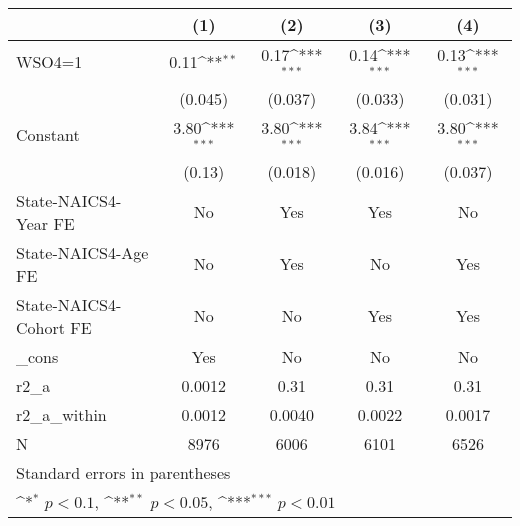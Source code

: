 {
\def\sym#1{\ifmmode^{#1}\else\(^{#1}\)\fi}
\begin{tabular}{l*{4}{c}}
\hline\hline
                    &\multicolumn{1}{c}{(1)}         &\multicolumn{1}{c}{(2)}         &\multicolumn{1}{c}{(3)}         &\multicolumn{1}{c}{(4)}         \\
\hline
WSO4=1              &        0.11\sym{**} &        0.17\sym{***}&        0.14\sym{***}&        0.13\sym{***}\\
                    &     (0.045)         &     (0.037)         &     (0.033)         &     (0.031)         \\
[1em]
Constant            &        3.80\sym{***}&        3.80\sym{***}&        3.84\sym{***}&        3.80\sym{***}\\
                    &      (0.13)         &     (0.018)         &     (0.016)         &     (0.037)         \\
[1em]
State-NAICS4-Year FE&          No         &         Yes         &         Yes         &          No         \\
[1em]
State-NAICS4-Age FE &          No         &         Yes         &          No         &         Yes         \\
[1em]
State-NAICS4-Cohort FE&          No         &          No         &         Yes         &         Yes         \\
[1em]
\_cons              &         Yes         &          No         &          No         &          No         \\
\hline
r2\_a                &      0.0012         &        0.31         &        0.31         &        0.31         \\
r2\_a\_within         &      0.0012         &      0.0040         &      0.0022         &      0.0017         \\
N                   &        8976         &        6006         &        6101         &        6526         \\
\hline\hline
\multicolumn{5}{l}{\footnotesize Standard errors in parentheses}\\
\multicolumn{5}{l}{\footnotesize \sym{*} \(p<0.1\), \sym{**} \(p<0.05\), \sym{***} \(p<0.01\)}\\
\end{tabular}
}
